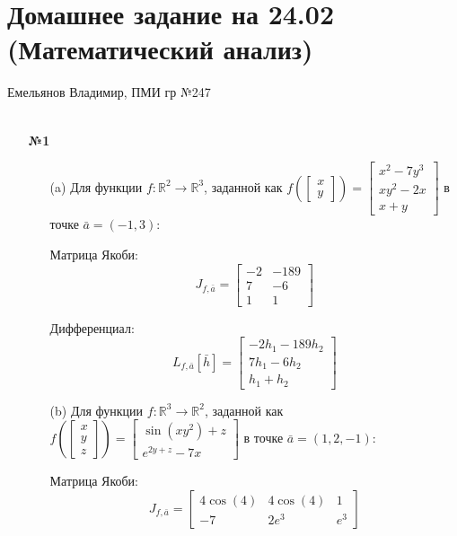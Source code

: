 \documentclass[a4paper]{article}
\begin{document}
\section*{Домашнее задание на 24.02 (Математический анализ)}
 {\large Емельянов Владимир, ПМИ гр №247}\\\\
\begin{enumerate}
    \item[\textbf{№1}]
    \begin{enumerate}
        \item[(a)]Для функции \( f: \mathbb{R}^2 \rightarrow \mathbb{R}^3 \), заданной как \( f\left(\begin{bmatrix} x \\ y \end{bmatrix}\right) = \begin{bmatrix} x^2 - 7y^3 \\ xy^2 - 2x \\ x + y \end{bmatrix} \) в точке \( \bar{a} = (-1, 3) \):

        Матрица Якоби:
        \[
        J_{f, \bar{a}} = \begin{bmatrix}
        -2 & -189 \\
        7 & -6 \\
        1 & 1
        \end{bmatrix}
        \]
        
        Дифференциал:
        \[
        L_{f, \bar{a}}[\bar{h}] = \begin{bmatrix} -2h_1 - 189h_2 \\ 7h_1 - 6h_2 \\ h_1 + h_2 \end{bmatrix}
        \]
        
        \item[(b)] Для функции \( f: \mathbb{R}^3 \rightarrow \mathbb{R}^2 \), заданной как \( f\left(\begin{bmatrix} x \\ y \\ z \end{bmatrix}\right) = \begin{bmatrix} \sin(xy^2) + z \\ e^{2y + z} - 7x \end{bmatrix} \) в точке \( \bar{a} = (1, 2, -1) \):
        
        Матрица Якоби:
        \[
        J_{f, \bar{a}} = \begin{bmatrix}
        4\cos(4) & 4\cos(4) & 1 \\
        -7 & 2e^3 & e^3
        \end{bmatrix}
        \]
        

\end{enumerate}
\end{enumerate}
\end{document}

